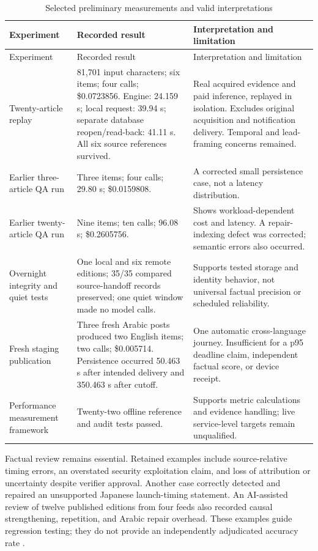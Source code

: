 \begingroup
\small
\renewcommand{\arraystretch}{1.07}
\begin{longtable}{L{2.7cm}L{4.7cm}L{\dimexpr\linewidth-7.4cm-6\tabcolsep\relax}}
\caption{Selected preliminary measurements and valid interpretations}\label{tab:results}\\
\toprule Experiment & Recorded result & Interpretation and limitation \\ \midrule
\endfirsthead
\toprule Experiment & Recorded result & Interpretation and limitation \\ \midrule
\endhead
\bottomrule
\endfoot
Twenty-article replay \cite{v3twenty} & 81,701 input characters; six items; four calls; \$0.0723856. Engine: 24.159 s; local request: 39.94 s; separate database reopen/read-back: 41.11 s. All six source references survived.
& Real acquired evidence and paid inference, replayed in isolation. Excludes original acquisition and notification delivery. Temporal and lead-framing concerns remained. \\
Earlier three-article QA run \cite{v3overnight} & Three items; four calls; 29.80 s; \$0.0159808.
& A corrected small persistence case, not a latency distribution. \\
Earlier twenty-article QA run \cite{v3overnight} & Nine items; ten calls; 96.08 s; \$0.2605756.
& Shows workload-dependent cost and latency. A repair-indexing defect was corrected; semantic errors also occurred. \\
Overnight integrity and quiet tests \cite{v3overnight} & One local and six remote editions; 35/35 compared source-handoff records preserved; one quiet window made no model calls.
& Supports tested storage and identity behavior, not universal factual precision or scheduled reliability. \\
Fresh staging publication \cite{nonemptytrial} & Three fresh Arabic posts produced two English items; two calls; \$0.005714. Persistence occurred 50.463 s after intended delivery and 350.463 s after cutoff.
& One automatic cross-language journey. Insufficient for a p95 deadline claim, independent factual score, or device receipt. \\
Performance measurement framework \cite{performanceprotocol} & Twenty-two offline reference and audit tests passed.
& Supports metric calculations and evidence handling; live service-level targets remain unqualified. \\
\end{longtable}
\endgroup

Factual review remains essential. Retained examples include source-relative timing errors, an overstated security exploitation claim, and loss of attribution or uncertainty despite verifier approval. Another case correctly detected and repaired an unsupported Japanese launch-timing statement. An AI-assisted review of twelve published editions from four feeds also recorded causal strengthening, repetition, and Arabic repair overhead. These examples guide regression testing; they do not provide an independently adjudicated accuracy rate \cite{v3overnight,v3twenty,retainedaudit}.

